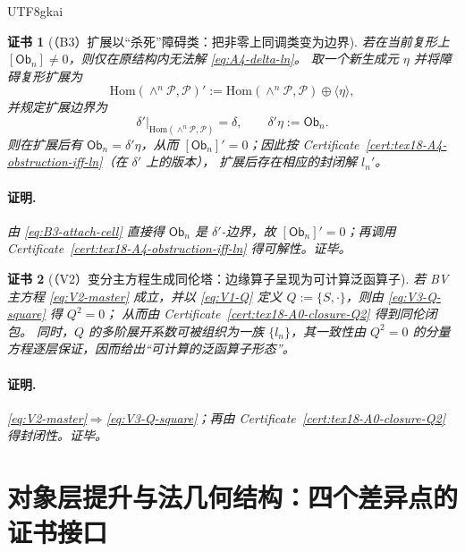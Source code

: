\documentclass[12pt]{article}
\newtheorem{Certificate}{证书}[section]
\newcommand{\Ob}{\ensuremath{\mathsf{Ob}}}
\begin{document}
\begin{CJK*}{UTF8}{gkai}
\begin{Certificate}[（B3）扩展以“杀死”障碍类：把非零上同调类变为边界]
\label{cert:tex18-B3-extend-kill-obstruction}
若在当前复形上 $[\Ob_n]\neq 0$，则仅在原结构内无法解 \eqref{eq:A4-delta-ln}。
取一个新生成元 $\eta$ 并将障碍复形扩展为
\[
\mathrm{Hom}(\wedge^n\mathcal{P},\mathcal{P})'
:=
\mathrm{Hom}(\wedge^n\mathcal{P},\mathcal{P})\oplus \langle \eta\rangle,
\]
并规定扩展边界为
\begin{equation}
\tag{B3}
\label{eq:B3-attach-cell}
  \delta'|_{\mathrm{Hom}(\wedge^n\mathcal{P},\mathcal{P})}=\delta,
  \qquad
  \delta'\eta:=\Ob_n.
\end{equation}
则在扩展后有 $\Ob_n=\delta'\eta$，从而 $[\Ob_n]'=0$；因此按 Certificate~\ref{cert:tex18-A4-obstruction-iff-ln}（在 $\delta'$ 上的版本），
  扩展后存在相应的封闭解 $l_n'$。
\paragraph{证明.}
由 \eqref{eq:B3-attach-cell} 直接得 $\Ob_n$ 是 $\delta'$-边界，故 $[\Ob_n]'=0$；再调用 Certificate~\ref{cert:tex18-A4-obstruction-iff-ln} 得可解性。证毕。
\end{Certificate}

\begin{Certificate}[（V2）变分主方程生成同伦塔：边缘算子呈现为可计算泛函算子]
\label{cert:tex18-V2-variational-generates}
若 BV 主方程 \eqref{eq:V2-master} 成立，并以 \eqref{eq:V1-Q} 定义 $Q:=\{S,\cdot\}$，则由 \eqref{eq:V3-Q-square} 得 $Q^2=0$；
从而由 Certificate~\ref{cert:tex18-A0-closure-Q2} 得到同伦闭包。
同时，$Q$ 的多阶展开系数可被组织为一族 $\{l_n\}$，其一致性由 $Q^2=0$ 的分量方程逐层保证，因而给出“可计算的泛函算子形态”。
\paragraph{证明.}
\eqref{eq:V2-master}$\Rightarrow$\eqref{eq:V3-Q-square}；再由 Certificate~\ref{cert:tex18-A0-closure-Q2} 得封闭性。证毕。
\end{Certificate}

\clearpage

\section{对象层提升与法几何结构：四个差异点的证书接口}
\label{sec:tex18-lawspace-difference-certificates}


\end{CJK*}
\end{document}
